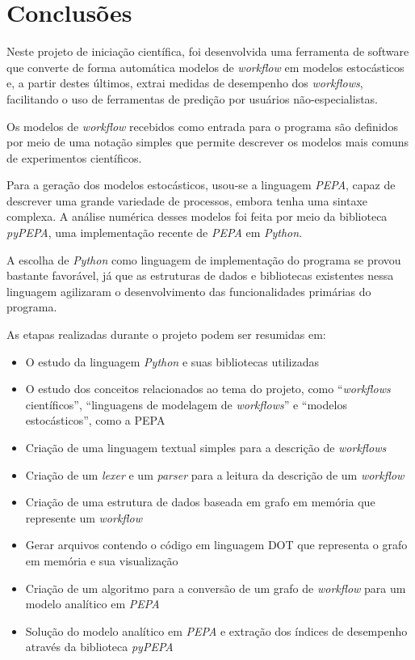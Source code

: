 \documentclass[a4paper,11pt]{article}
\begin{document}
  \section{Conclusões}
  	Neste projeto de iniciação científica, foi desenvolvida uma ferramenta de software que converte de forma autom\'atica modelos de \emph{workflow} em modelos estocásticos e, a partir destes \'ultimos, extrai medidas de desempenho dos \emph{workflows}, facilitando o uso de ferramentas de prediç\~ao por usu\'arios não-especialistas.

    Os modelos de \emph{workflow} recebidos como entrada para o programa são definidos por meio de uma notaç\~ao simples que permite descrever os modelos mais comuns de experimentos cient\'ificos.

    Para a geraç\~ao dos modelos estocásticos, usou-se a linguagem \emph{PEPA}, capaz de descrever uma grande variedade de processos, embora tenha uma sintaxe complexa. A análise numérica desses modelos foi feita por meio da biblioteca \emph{pyPEPA}, uma implementação recente de \emph{PEPA} em \emph{Python}.

    A escolha de \emph{Python} como linguagem de implementação do programa se provou bastante favorável, já que as estruturas de dados e bibliotecas existentes nessa linguagem agilizaram o desenvolvimento das funcionalidades primárias do programa.

  	As etapas realizadas durante o projeto podem ser resumidas em:
  	\begin{itemize}
  		\item O estudo da linguagem \emph{Python} e suas bibliotecas utilizadas
  		\item O estudo dos conceitos relacionados ao tema do projeto, como ``\emph{workflows} científicos'', ``linguagens de modelagem de \emph{workflows}'' e ``modelos estocásticos'', como a PEPA
  		\item Criação de uma linguagem textual simples para a descrição de \emph{workflows}
  		\item Criação de um \emph{lexer} e um \emph{parser} para a leitura da descrição de um \emph{workflow}
  		\item Criação de uma estrutura de dados baseada em grafo em memória que represente um \emph{workflow}
  		\item Gerar arquivos contendo o código em linguagem DOT que representa o grafo em memória e sua visualização
        \item Criação de um algoritmo para a conversão de um grafo de \emph{workflow} para um modelo analítico em \emph{PEPA}
        \item Solução do modelo analítico em \emph{PEPA} e extração dos \'indices de desempenho atrav\'es da biblioteca \emph{pyPEPA}
  	\end{itemize}
\end{document}
